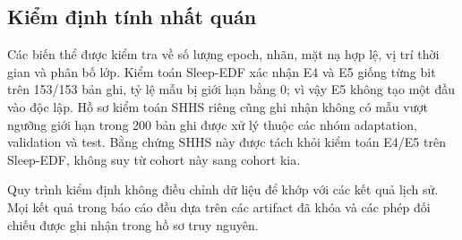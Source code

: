 \subsection{Kiểm định tính nhất quán}

Các biến thể được kiểm tra về số lượng epoch, nhãn, mặt nạ hợp lệ, vị trí thời gian và phân bố lớp. Kiểm toán Sleep-EDF xác nhận E4 và E5 giống từng bit trên 153/153 bản ghi, tỷ lệ mẫu bị giới hạn bằng 0; vì vậy E5 không tạo một đầu vào độc lập. Hồ sơ kiểm toán SHHS riêng cũng ghi nhận không có mẫu vượt ngưỡng giới hạn trong 200 bản ghi được xử lý thuộc các nhóm adaptation, validation và test. Bằng chứng SHHS này được tách khỏi kiểm toán E4/E5 trên Sleep-EDF, không suy từ cohort này sang cohort kia.

Quy trình kiểm định không điều chỉnh dữ liệu để khớp với các kết quả lịch sử. Mọi kết quả trong báo cáo đều dựa trên các artifact đã khóa và các phép đối chiếu được ghi nhận trong hồ sơ truy nguyên.
